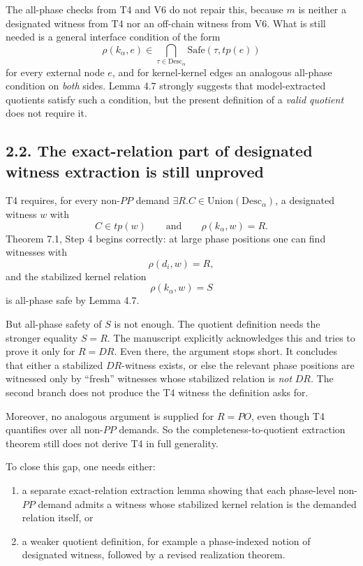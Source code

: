 \documentclass[11pt]{article}
\begin{document}
The all-phase checks from T4 and V6 do not repair this, because \(m\) is neither a designated witness from T4 nor an off-chain witness from V6. What is still needed is a general interface condition of the form
\[
\rho(k_\alpha,e)\in \bigcap_{\tau\in \mathrm{Desc}_\alpha}\mathrm{Safe}(\tau,tp(e))
\]
for every external node \(e\), and for kernel-kernel edges an analogous all-phase condition on \emph{both} sides. Lemma 4.7 strongly suggests that model-extracted quotients satisfy such a condition, but the present definition of a \emph{valid quotient} does not require it.

\subsection*{2.2. The exact-relation part of designated witness extraction is still unproved}

T4 requires, for every non-\(PP\) demand \(\exists R.C\in \mathrm{Union}(\mathrm{Desc}_\alpha)\), a designated witness \(w\) with
\[
C\in tp(w)\qquad\text{and}\qquad \rho(k_\alpha,w)=R.
\]
Theorem 7.1, Step 4 begins correctly: at large phase positions one can find witnesses with
\[
\rho(d_i,w)=R,
\]
and the stabilized kernel relation
\[
\rho(k_\alpha,w)=S
\]
is all-phase safe by Lemma 4.7.

But all-phase safety of \(S\) is not enough. The quotient definition needs the stronger equality \(S=R\). The manuscript explicitly acknowledges this and tries to prove it only for \(R=DR\). Even there, the argument stops short. It concludes that either a stabilized \(DR\)-witness exists, or else the relevant phase positions are witnessed only by ``fresh'' witnesses whose stabilized relation is \emph{not} \(DR\). The second branch does not produce the T4 witness the definition asks for.

Moreover, no analogous argument is supplied for \(R=PO\), even though T4 quantifies over all non-\(PP\) demands. So the completeness-to-quotient extraction theorem still does not derive T4 in full generality.

To close this gap, one needs either:
\begin{enumerate}[leftmargin=1.5em,itemsep=0.25em]
\item a separate exact-relation extraction lemma showing that each phase-level non-\(PP\) demand admits a witness whose stabilized kernel relation is the demanded relation itself, or
\item a weaker quotient definition, for example a phase-indexed notion of designated witness, followed by a revised realization theorem.
\end{enumerate}
\end{document}
